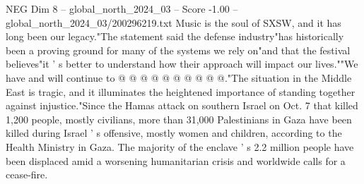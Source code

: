 \begin{textsample}{NEG Dim 8 – global\_north\_2024\_03 – Score -1.00 – global\_north\_2024\_03/200296219.txt}
Music is the soul of SXSW, and it has long been our legacy."The statement said the defense industry"has historically been a proving ground for many of the systems we rely on"and that the festival believes"it ' s better to understand how their approach will impact our lives.""We have and will continue to @ @ @ @ @ @ @ @ @ @."The situation in the Middle East is tragic, and it illuminates the heightened importance of standing together against injustice."Since the Hamas attack on southern Israel on Oct. 7 that killed 1,200 people, mostly civilians, more than 31,000 Palestinians in Gaza have been killed during Israel ' s offensive, mostly women and children, according to the Health Ministry in Gaza.
The majority of the enclave ' s 2.2 million people have been displaced amid a worsening humanitarian crisis and worldwide calls for a cease-fire.

\end{textsample}

